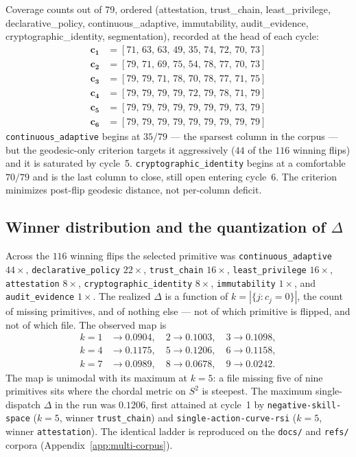 \documentclass[11pt,a4paper]{article}
\theoremstyle{plain}
\theoremstyle{remark}
\theoremstyle{plain}
\begin{document}
Coverage counts out of 79, ordered (attestation, trust\_chain, least\_privilege, declarative\_policy, continuous\_adaptive, immutability, audit\_evidence, cryptographic\_identity, segmentation), recorded at the head of each cycle:
\begin{align*}
\mathbf{c_1} &= [71,\, 63,\, 63,\, 49,\, 35,\, 74,\, 72,\, 70,\, 73] \\
\mathbf{c_2} &= [79,\, 71,\, 69,\, 75,\, 54,\, 78,\, 77,\, 70,\, 73] \\
\mathbf{c_3} &= [79,\, 79,\, 71,\, 78,\, 70,\, 78,\, 77,\, 71,\, 75] \\
\mathbf{c_4} &= [79,\, 79,\, 79,\, 79,\, 72,\, 79,\, 78,\, 71,\, 79] \\
\mathbf{c_5} &= [79,\, 79,\, 79,\, 79,\, 79,\, 79,\, 79,\, 73,\, 79] \\
\mathbf{c_6} &= [79,\, 79,\, 79,\, 79,\, 79,\, 79,\, 79,\, 79,\, 79]
\end{align*}
\texttt{continuous\_adaptive} begins at $35/79$ --- the sparsest column in the corpus --- but the geodesic-only criterion targets it aggressively ($44$ of the $116$ winning flips) and it is saturated by cycle~5. \texttt{cryptographic\_identity} begins at a comfortable $70/79$ and is the last column to close, still open entering cycle~6. The criterion minimizes post-flip geodesic distance, not per-column deficit.

\subsection{Winner distribution and the quantization of $\Delta$}

Across the $116$ winning flips the selected primitive was \texttt{continuous\_adaptive} $44\times$, \texttt{declarative\_policy} $22\times$, \texttt{trust\_chain} $16\times$, \texttt{least\_privilege} $16\times$, \texttt{attestation} $8\times$, \texttt{cryptographic\_identity} $8\times$, \texttt{immutability} $1\times$, and \texttt{audit\_evidence} $1\times$. The realized $\Delta$ is a function of $k = |\{j : c_j = 0\}|$, the count of missing primitives, and of nothing else --- not of which primitive is flipped, and not of which file. The observed map is
\begin{align*}
k = 1 &\to 0.0904, \quad 2 \to 0.1003, \quad 3 \to 0.1098, \\
k = 4 &\to 0.1175, \quad 5 \to 0.1206, \quad 6 \to 0.1158, \\
k = 7 &\to 0.0989, \quad 8 \to 0.0678, \quad 9 \to 0.0242.
\end{align*}
The map is unimodal with its maximum at $k = 5$: a file missing five of nine primitives sits where the chordal metric on $S^2$ is steepest. The maximum single-dispatch $\Delta$ in the run was $0.1206$, first attained at cycle~1 by \texttt{negative-skill-space} ($k = 5$, winner \texttt{trust\_chain}) and \texttt{single-action-curve-rsi} ($k = 5$, winner \texttt{attestation}). The identical ladder is reproduced on the \texttt{docs/} and \texttt{refs/} corpora (Appendix~\ref{app:multi-corpus}).
\end{document}
